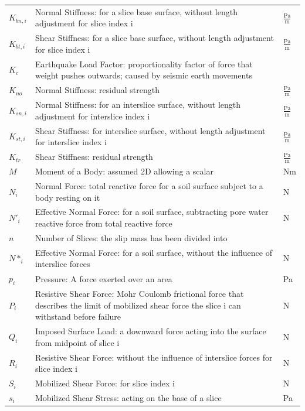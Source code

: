 \documentclass[12pt]{article}
\begin{document}
\begin{longtable*}{l l l}
\\
$K_{bn,i}$ & Normal Stiffness: for a slice base surface, without length adjustment for slice index i & $\frac{\text{Pa}}{\text{m}}$
\\
$K_{bt,i}$ & Shear Stiffness: for a slice base surface, without length adjustment for slice index i & $\frac{\text{Pa}}{\text{m}}$
\\
$K_{c}$ & Earthquake Load Factor: proportionality factor of force that weight pushes outwards; caused by seismic earth movements & 
\\
$K_{no}$ & Normal Stiffness: residual strength & $\frac{\text{Pa}}{\text{m}}$
\\
$K_{sn,i}$ & Normal Stiffness: for an interslice surface, without length adjustment for interslice index i & $\frac{\text{Pa}}{\text{m}}$
\\
$K_{st,i}$ & Shear Stiffness: for interslice surface, without length adjustment for interslice index i & $\frac{\text{Pa}}{\text{m}}$
\\
$K_{tr}$ & Shear Stiffness: residual strength & $\frac{\text{Pa}}{\text{m}}$
\\
$M$ & Moment of a Body: assumed 2D allowing a scalar & Nm
\\
$N_{i}$ & Normal Force: total reactive force for a soil surface subject to a body resting on it & N
\\
$N'_{i}$ & Effective Normal Force: for a soil surface, subtracting pore water reactive force from total reactive force & N
\\
$n$ & Number of Slices: the slip mass has been divided into & 
\\
$N*_{i}$ & Effective Normal Force: for a soil surface, without the influence of interslice forces & N
\\
$p_{i}$ & Pressure: A force exerted over an area & Pa
\\
$P_{i}$ & Resistive Shear Force: Mohr Coulomb frictional force that describes the limit of mobilized shear force the slice i can withstand before failure & N
\\
$Q_{i}$ & Imposed Surface Load: a downward force acting into the surface from midpoint of slice i & N
\\
$R_{i}$ & Resistive Shear Force: without the influence of interslice forces for slice index i & N
\\
$S_{i}$ & Mobilized Shear Force: for slice index i & N
\\
$s_{i}$ & Mobilized Shear Stress: acting on the base of a slice & Pa
\\

\end{longtable*}
\end{document}

